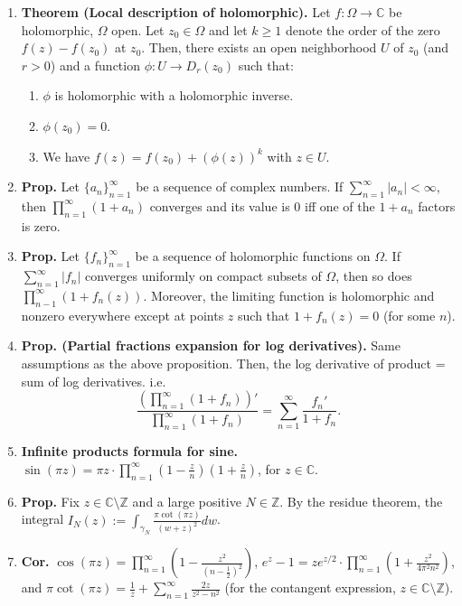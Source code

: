 \documentclass[12pt]{article}
\theoremstyle{definition}
\theoremstyle{named}
\begin{document}
{\begin{multicols}{2}
\begin{spacing}{1.01}
\begin{enumerate}
    \item \textbf{Theorem (Local description of holomorphic). } Let $f: \Omega \to \mathbb{C}$ be holomorphic, $\Omega$ open. Let $z_0 \in \Omega$ and let $k \geq 1$ denote the order of the zero $f(z) - f(z_0)$ at $z_0$. Then, there exists an open neighborhood $U$ of $z_0$ (and $r>0$) and a function $\phi: U \to D_r(z_0)$ such that: 
    \begin{enumerate}
        \item $\phi$ is holomorphic with a holomorphic inverse. 
        \item $\phi(z_0) = 0$. 
        \item We have $f(z) = f(z_0) + (\phi(z))^k$ with $z \in U$. 
    \end{enumerate}
    \item \textbf{Prop. } Let $\{a_n\}_{n=1}^{\infty}$ be a sequence of complex numbers. If $\sum_{n=1}^{\infty}|a_n| < \infty$, then $\prod_{n=1}^{\infty}(1+a_n)$ converges and its value is 0 iff one of the $1+a_n$ factors is zero. 
    \item \textbf{Prop. } Let $\{f_n\}_{n=1}^{\infty}$ be a sequence of holomorphic functions on $\Omega$. If $\sum_{n=1}^{\infty}|f_n|$ converges uniformly on compact subsets of $\Omega$, then so does $\prod_{n-1}^{\infty}(1 + f_n(z))$. Moreover, the limiting function is holomorphic and nonzero everywhere except at points $z$ such that $1 + f_n(z) = 0$ (for some $n$). 
    \item \textbf{Prop. (Partial fractions expansion for log derivatives). } Same assumptions as the above proposition. Then, the log derivative of product = sum of log derivatives. i.e. 
    $$
    \frac{\left(\prod_{n=1}^{\infty}(1+f_n)\right)'}{\prod_{n=1}^{\infty}(1+f_n)} = \sum_{n=1}^{\infty} \frac{f_n'}{1 + f_n}. 
    $$
    \item \textbf{Infinite products formula for sine. } $\sin(\pi z) = \pi z \cdot \prod_{n=1}^{\infty}(1 - \frac{z}{n})(1 + \frac{z}{n})$, for $z \in \mathbb{C}$. 
    \item \textbf{Prop. } Fix $z \in \mathbb{C} \setminus \mathbb{Z}$ and a large positive $N \in \mathbb{Z}$. By the residue theorem, the integral $I_N(z) := \int_{\gamma_N} \frac{\pi\cot(\pi z)}{(w+z)^2} dw$. 
    \item \textbf{Cor. } $\cos(\pi z) = \prod_{n=1}^{\infty} \left(1 - \frac{z^2}{\left(n - \frac{1}{2}\right)^2}\right)$, $e^z - 1 = ze^{z/2} \cdot \prod_{n=1}^{\infty} \left(1 + \frac{z^2}{4\pi^2n^2}\right)$, and $\pi\cot(\pi z) = \frac{1}{z} + \sum_{n=1}^{\infty} \frac{2z}{z^2 - n^2}$ (for the contangent expression, $z \in \mathbb{C} \setminus \mathbb{Z}$). 

\end{enumerate}
\end{spacing}
\end{multicols}}
\end{document}
